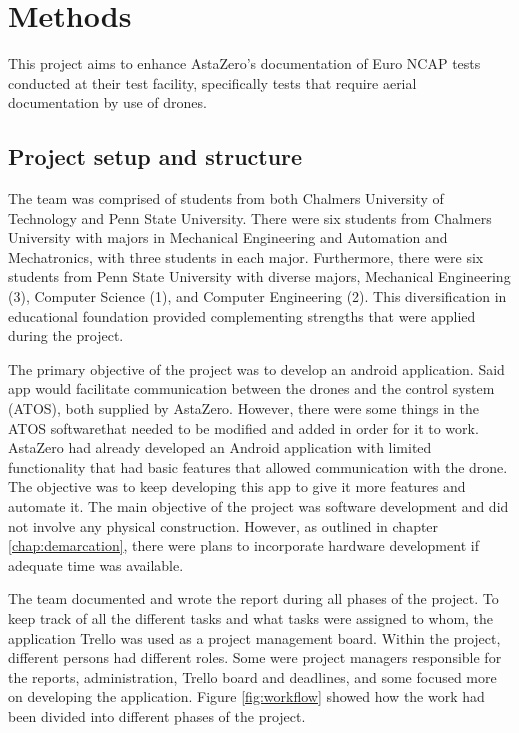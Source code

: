 
\chapter{Methods}
This project aims to enhance AstaZero's documentation of Euro NCAP tests conducted at their test facility, specifically tests that require aerial documentation by use of drones.

\section{Project setup and structure}
The team was comprised of students from both Chalmers University of Technology
and Penn State University. There were six students from Chalmers University with
majors in Mechanical Engineering and Automation and Mechatronics, with three
students in each major. Furthermore, there were six students from Penn State University with diverse majors, Mechanical Engineering (3), Computer Science (1), and Computer Engineering (2). This diversification in educational foundation provided complementing strengths that were applied during the project.

The primary objective of the project was to develop an android application. Said app would facilitate communication between the drones and the control system (ATOS), both supplied by AstaZero. However, there were some things in the ATOS softwarethat  needed to be modified and added in order for it to work. AstaZero had already developed an Android application with limited functionality that had basic features that allowed communication with the drone. The objective was to keep developing this app to give it more features and automate it. The main objective of the project was software development and did not involve any physical construction. However, as outlined in chapter \ref{chap:demarcation}, there were plans to incorporate hardware development if adequate time was available.

The team documented and wrote the report during all phases of the project. To keep track of all the different tasks and what tasks were assigned to whom, the application Trello was used as a project management board. Within the project, different persons had different roles. Some were project managers responsible for the reports, administration, Trello board and deadlines, and some focused more on developing the application. Figure \ref{fig:workflow} showed how the work had been divided into different phases of the project.



